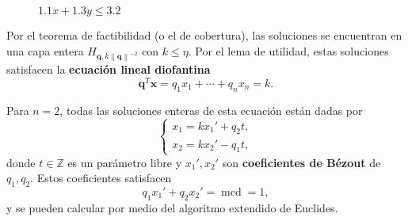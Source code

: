 \documentclass[aspectratio=169,professionalfonts]{beamer}
\newcommand{\Z}{\mathbb{Z}}
\newcommand{\norm}[1]{\left\lVert #1 \right\rVert}
\renewcommand{\vec}[1]{\boldsymbol{#1}}
\newcommand{\clayer}[2]{H_{#1, #2}}
\newcommand{\qlayer}[2]{\clayer{\vec{#1}}{#2\norm{\vec{#1}}^{-2}}}
\renewcommand{\gcd}[1]{\mathop{\mathrm{mcd}{\left\lbrace #1 \right\rbrace}}}
\begin{document}
\begin{frame}
\begin{minipage}{0.45\textwidth}
\begin{figure}
			\caption*{$1.1x + 1.3y \leq 3.2$}
		\end{figure}
	\end{minipage}
\end{frame}

\begin{frame}
	Por el teorema de factibilidad (o el de cobertura), las soluciones se
	encuentran en una capa entera $\qlayer{q}{k}$ con $k \leq \eta$. Por
	el lema de utilidad, estas soluciones satisfacen la \textbf{ecuación lineal
	diofantina}
	\begin{equation*}
		\vec{q}^T\vec{x} = q_1x_1 + \cdots + q_nx_n = k.
	\end{equation*}
\end{frame}

\begin{frame}
	Para $n = 2$, todas las soluciones enteras de esta ecuación están dadas por
	\begin{equation*}
		\begin{cases}
			x_1 = kx_1' + q_2t, \\
			x_2 = kx_2' - q_1t,
		\end{cases}
	\end{equation*}
	donde $t \in \Z$ es un parámetro libre y $x_1', x_2'$ son
	\textbf{coeficientes de Bézout} de $q_1, q_2$. Estos coeficientes satisfacen
	\begin{equation*}
		q_1x_1' + q_2x_2' = \gcd{q_1, q_2} = 1,
	\end{equation*}
	y se pueden calcular por medio del algoritmo extendido de Euclides.
\end{frame}
\end{document}
